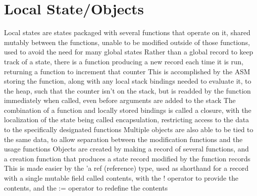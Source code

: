 \documentclass[11 pt, twoside]{article}
\newenvironment{outline*}
{
	\begin{outline}[enumerate]
	}
	{\end{outline}
}
\begin{document}
\section{Local State/Objects}
\begin{outline*}
\1 Local states are states packaged with several functions that operate on it, shared mutably between the functions, unable to be modified outside of those functions, used to avoid the need for many global states
	\2 Rather than a global record to keep track of a state, there is a function producing a new record each time it is run, returning a function to increment that counter
	\2 This is accomplished by the ASM storing the function, along with any local stack bindings needed to evaluate it, to the heap, such that the counter isn't on the stack, but is readded by the function immediately when called, even before arguments are added to the stack
	\2 The combination of a function and locally stored bindings is called a closure, with the localization of the state being called encapsulation, restricting access to the data to the specifically designated functions
		\3 Multiple objects are also able to be tied to the same data, to allow separation between the modification functions and the usage functions
\1 Objects are created by making a record of several functions, and a creation function that produces a state record modified by the function records
	\2 This is made easier by the 'a ref (reference) type, used as shorthand for a record with a single mutable field called contents, with the ! operator to provide the contents, and the := operator to redefine the contents
\end{outline*}
\end{document}

